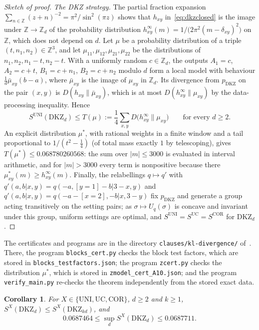 \documentclass[11pt]{amsart}
\newtheorem{corollary}[theorem]{Corollary}
\theoremstyle{definition}
\theoremstyle{remark}
\numberwithin{equation}{section}
\newcommand{\Z}{\mathbb{Z}}
\newcommand{\DKZ}{\mathrm{DKZ}}
\begin{document}
\begin{proof}[Sketch of proof]
\emph{The DKZ strategy.} The partial fraction expansion $\sum_{n\in\Z}(z+n)^{-2}=\pi^2/\sin^2(\pi z)$ shows that $h_{xy}$
in~\eqref{eq:dkzclosed} is the image under $\Z\to\Z_d$ of the probability distribution
$h^\infty_{xy}(m)=1/\bigl(2\pi^2(m-\delta_{xy})^2\bigr)$ on $\Z$, which does not depend on $d$. Let $\mu$ be a probability
distribution of a triple $(t,n_1,n_2)\in\Z^3$, and let $\mu_{11},\mu_{12},\mu_{21},\mu_{22}$ be the distributions of
$n_1,n_2,n_1-t,n_2-t$. With a uniformly random $c\in\Z_d$, the outputs $A_1=c$, $A_2=c+t$, $B_1=c+n_1$, $B_2=c+n_2$
modulo $d$ form a local model with behaviour $\frac1d\bar\mu_{xy}(b-a)$, where $\bar\mu_{xy}$ is the image of
$\mu_{xy}$ in $\Z_d$. Its divergence from $p_{\DKZ}$ on the pair $(x,y)$ is $D(h_{xy}\|\bar\mu_{xy})$, which is at most
$D(h^\infty_{xy}\|\mu_{xy})$ by the data-processing inequality. Hence
\[
S^{\mathrm{UNI}}(\DKZ_d)\le T(\mu):=\frac14\sum_{x,y}D\bigl(h^\infty_{xy}\big\|\mu_{xy}\bigr)\qquad\text{for every }d\ge2.
\]
An explicit distribution $\mu^*$, with rational weights in a finite window and a tail proportional to $1/(t^2-\frac14)$
(of total mass exactly $1$ by telescoping), gives $T(\mu^*)\le0.068780260568$: the sum over $|m|\le3000$ is evaluated in
interval arithmetic, and for $|m|>3000$ every term is nonpositive because there $\mu^*_{xy}(m)\ge h^\infty_{xy}(m)$.
Finally, the relabellings $q\mapsto q'$ with $q'(a,b|x,y)=q(-a,[y=1]-b|3-x,y)$ and
$q'(a,b|x,y)=q(-a-[x=2],-b|x,3-y)$ fix $p_{\DKZ}$ and generate a group acting transitively on the setting pairs; as
$\sigma\mapsto U_q(\sigma)$ is concave and invariant under this group, uniform settings are optimal, and
$S^{\mathrm{UNI}}=S^{\mathrm{UC}}=S^{\mathrm{COR}}$ for $\DKZ_d$.
\end{proof}

The certificates and programs are in the directory \texttt{clauses/kl-divergence/}
of~\cite{repo-oqp27}. There, the program \texttt{blocks\_cert.py} checks the block test factors, which are stored in
\texttt{blocks\_testfactors.json}; the program \texttt{zcert.py} checks the distribution $\mu^*$, which is stored in
\texttt{zmodel\_cert\_A10.json}; and the program \texttt{verify\_main.py} re-checks the theorem independently from the
stored exact data.

\begin{corollary}\label{cor:klsup}
For $X\in\{\mathrm{UNI},\mathrm{UC},\mathrm{COR}\}$, $d\ge2$ and $k\ge1$, $S^X(\DKZ_d)\le S^X(\DKZ_{kd})$, and
\[
0.0687464\le\sup_dS^X(\DKZ_d)\le0.0687711 .
\]
\end{corollary}
\end{document}
